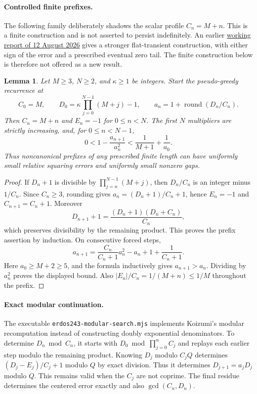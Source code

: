 \documentclass[11pt]{article}
\newtheorem{lemma}{Lemma}
\begin{document}
\paragraph{Controlled finite prefixes.}
The following family deliberately shadows the scalar profile $C_n=M+n$.
This is a finite construction and is not asserted to persist indefinitely.
An earlier
\href{https://www.erdosproblemaday.com/report/243}{working report of
12 August 2026} gives a stronger flat-transient construction, with either
sign of the error and a prescribed eventual zero tail. The finite
construction below is therefore not offered as a new result.

\begin{lemma}
Let $M\ge3$, $N\ge2$, and $\kappa\ge1$ be integers. Start the
pseudo-greedy recurrence at
\[
 C_0=M,\qquad D_0=\kappa\prod_{j=0}^{N-1}(M+j)-1,
 \qquad a_n=1+\operatorname{round}(D_n/C_n).
\]
Then $C_n=M+n$ and $E_n=-1$ for $0\le n<N$.
The first $N$ multipliers are strictly increasing, and, for $0\le n<N-1$,
\[
 0<1-\frac{a_{n+1}}{a_n^2}
 <\frac1{M+1}+\frac1{a_0}.
\]
Thus noncanonical prefixes of any prescribed finite length can have
uniformly small relative squaring errors and uniformly small nonzero gaps.
\end{lemma}
\begin{proof}
If $D_n+1$ is divisible by $\prod_{j=n}^{N-1}(M+j)$, then
$D_n/C_n$ is an integer minus $1/C_n$. Since $C_n\ge3$, rounding gives
$a_n=(D_n+1)/C_n+1$, hence $E_n=-1$ and $C_{n+1}=C_n+1$.
Moreover
\[
 D_{n+1}+1=\frac{(D_n+1)(D_n+C_n)}{C_n},
\]
which preserves divisibility by the remaining product. This proves the
prefix assertion by induction. On consecutive forced steps,
\[
 a_{n+1}=\frac{C_n}{C_n+1}a_n^2-a_n+1+\frac1{C_n+1}.
\]
Here $a_0\ge M+2\ge5$, and the formula inductively gives $a_{n+1}>a_n$.
Dividing by $a_n^2$ proves the displayed bound. Also
$|E_n|/C_n=1/(M+n)\le1/M$ throughout the prefix.
\end{proof}

\paragraph{Exact modular continuation.}
The executable \texttt{erdos243-modular-search.mjs} implements Koizumi's
modular recomputation instead of constructing doubly exponential denominators.
To determine $D_n\bmod C_n$, it starts with
$D_0\bmod\prod_{j=0}^n C_j$ and replays each earlier step modulo the
remaining product. Knowing $D_j$ modulo $C_j Q$ determines
$(D_j-E_j)/C_j+1$ modulo $Q$ by exact division. Thus it determines
$D_{j+1}=a_jD_j$ modulo $Q$. This remains valid when the $C_j$ are not
coprime. The final residue determines the centered error exactly and also
$\gcd(C_n,D_n)$.
\end{document}
